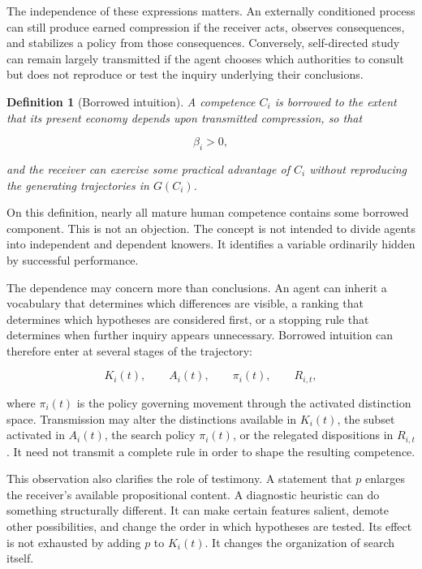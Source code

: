 \documentclass[11pt]{article}
\newtheorem{definition}[proposition]{Definition}
\begin{document}
The independence of these expressions matters. An externally conditioned process can still produce earned compression if the receiver acts, observes consequences, and stabilizes a policy from those consequences. Conversely, self-directed study can remain largely transmitted if the agent chooses which authorities to consult but does not reproduce or test the inquiry underlying their conclusions.

\begin{definition}[Borrowed intuition]
A competence $C_i$ is borrowed to the extent that its present economy depends upon transmitted compression, so that

\[
\beta_i > 0,
\]

and the receiver can exercise some practical advantage of $C_i$ without reproducing the generating trajectories in $G(C_i)$.
\end{definition}

On this definition, nearly all mature human competence contains some borrowed component. This is not an objection. The concept is not intended to divide agents into independent and dependent knowers. It identifies a variable ordinarily hidden by successful performance.

The dependence may concern more than conclusions. An agent can inherit a vocabulary that determines which differences are visible, a ranking that determines which hypotheses are considered first, or a stopping rule that determines when further inquiry appears unnecessary. Borrowed intuition can therefore enter at several stages of the trajectory:

\[
K_i(t), \qquad A_i(t), \qquad \pi_i(t), \qquad R_{i,t},
\]

where $\pi_i(t)$ is the policy governing movement through the activated distinction space. Transmission may alter the distinctions available in $K_i(t)$, the subset activated in $A_i(t)$, the search policy $\pi_i(t)$, or the relegated dispositions in $R_{i,t}$. It need not transmit a complete rule in order to shape the resulting competence.

This observation also clarifies the role of testimony. A statement that $p$ enlarges the receiver's available propositional content. A diagnostic heuristic can do something structurally different. It can make certain features salient, demote other possibilities, and change the order in which hypotheses are tested. Its effect is not exhausted by adding $p$ to $K_i(t)$. It changes the organization of search itself.
\end{document}
